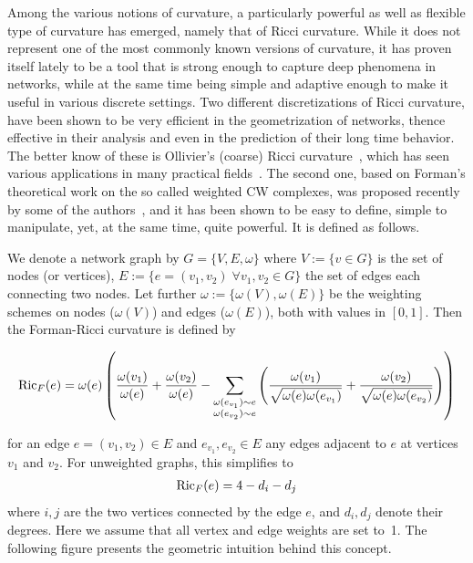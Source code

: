 \documentclass[english,11pt]{article}
\begin{document}
Among the various notions of curvature, a particularly powerful as well as flexible type of curvature has emerged,
namely that of Ricci curvature. While it does not represent one of the most commonly known versions of curvature,
it has proven itself lately to be a tool that is strong enough
to capture deep phenomena in networks, while at the same time being simple and adaptive enough to make it useful in various discrete settings.
Two different discretizations of Ricci curvature, have been shown to be very efficient in the geometrization of networks, thence effective
in their analysis and even in the prediction of their long time behavior. The better know of these is Ollivier's (coarse)
Ricci curvature~\cite{Ol1,Ol2},
which has seen various applications in many practical fields~\cite{Allen2,GGL}. The second one, based on Forman's theoretical work on the
so called weighted CW complexes, was proposed recently by some of the authors~\cite{SMJSS,WSJ1}, and it has been shown to be easy to define,
simple to manipulate, yet, at the same time, quite powerful.
It is defined as follows.

\medskip

\noindent
We denote a network graph by $G=\lbrace V, E, \omega \rbrace$ where $V :=\lbrace v \in G \rbrace$ is the set of nodes (or vertices),
$E := \lbrace e=(v_1 , v_2) \; \forall v_1, v_2 \in G\rbrace$ the set of edges each connecting two nodes.
Let further $\omega := \lbrace \omega (V), \omega (E)\rbrace$ be the weighting schemes on nodes ($\omega (V)$) and edges ($\omega (E)$),
both with values in $[0,1]$. Then the Forman-Ricci curvature is defined by

\begin{align}
 {\rm Ric}_F (e) = \omega(e) \left( \frac{\omega(v_1)}{\omega(e)} + \frac{\omega(v_2)}{\omega(e)}
 - \sum_{\substack{\omega(e_{v_1}) \sim e \\ \omega(e_{v_2}) \sim e}} \left( \frac{\omega(v_1)}{\sqrt{\omega(e)\omega(e_{v_1})}}
 + \frac{\omega(v_2)}{\sqrt{\omega(e)\omega(e_{v_2})}} \right) \right)
 \label{eq:FR-curv}
 \end{align} 

for an edge $e=(v_1, v_2) \in E$ and $e_{v_1}, e_{v_2} \in E$ any edges adjacent to $e$ at vertices $v_1$ and $v_2$.
For unweighted graphs, this simplifies to
\begin{align}
{\rm Ric}_F (e) = 4 - d_{i} - d_{j}
 \label{eq:FR_unweighted}
\end{align} 
\noindent where  $i,j$ are the two vertices connected by the edge $e$, and  $d_{i}, d_{j}$ denote their degrees.
Here we assume that all vertex and edge weights are set to~1. The following figure presents the geometric intuition behind this concept. 
\end{document}
